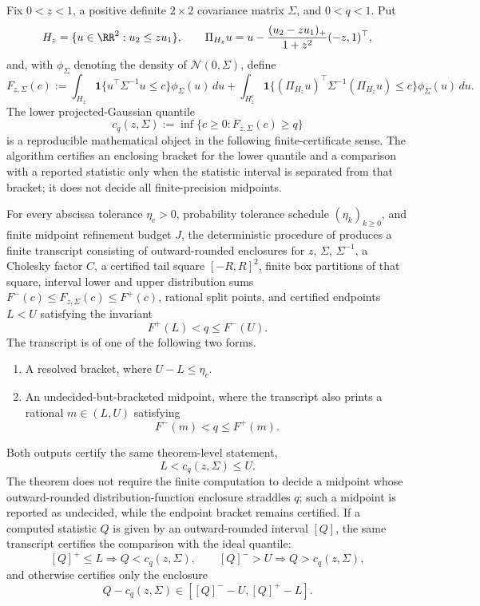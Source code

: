 \begin{algorithmiclemma}\label{alg:certified-projected-gaussian-quantile-algorithm-long-copy}
Fix \(0<z<1\), a positive definite \(2\times2\) covariance matrix
\(\Sigma\), and \(0<q<1\).  Put
\[
H_z=\{u\in\RR^2:u_2\le zu_1\},\qquad
\Pi_{H_z}u=u-\frac{(u_2-zu_1)_+}{1+z^2}(-z,1)^\top ,
\]
and, with \(\phi_\Sigma\) denoting the density of
\(\mathcal N(0,\Sigma)\), define
\begin{equation}\label{eq:certified-projected-gaussian-cdf-main}
F_{z,\Sigma}(c)
:=\int_{H_z}\mathbf1\{u^\top\Sigma^{-1}u\le c\}\phi_\Sigma(u)\,du
+\int_{H_z^c}
\mathbf1\{(\Pi_{H_z}u)^\top\Sigma^{-1}(\Pi_{H_z}u)\le c\}
\phi_\Sigma(u)\,du .
\end{equation}
The lower projected-Gaussian quantile
\[
c_q(z,\Sigma):=\inf\{c\ge0:F_{z,\Sigma}(c)\ge q\}
\]
is a reproducible mathematical object in the following finite-certificate
sense.  The algorithm certifies an enclosing bracket for the lower quantile
and a comparison with a reported statistic only when the statistic interval is
separated from that bracket; it does not decide all finite-precision
midpoints.

For every abscissa tolerance \(\eta_c>0\), probability tolerance schedule
\((\eta_k)_{k\ge0}\), and finite midpoint refinement budget \(J\), the
deterministic procedure of
 produces
a finite transcript consisting of outward-rounded enclosures for \(z\),
\(\Sigma\), \(\Sigma^{-1}\), a Cholesky factor \(C\), a certified tail square
\([-R,R]^2\), finite box partitions of that square, interval lower and upper
distribution sums \(F^-(c)\le F_{z,\Sigma}(c)\le F^+(c)\), rational split
points, and certified endpoints \(L<U\) satisfying the invariant
\[
F^+(L)<q\le F^-(U).
\]
The transcript is of one of the following two forms.
\begin{enumerate}[label=\textup{(\alph*)},leftmargin=2.4em,itemsep=0.2em]
\item A resolved bracket, where \(U-L\le\eta_c\).
\item An undecided-but-bracketed midpoint, where the transcript also prints a
rational \(m\in(L,U)\) satisfying
\[
F^-(m)<q\le F^+(m).
\]
\end{enumerate}
Both outputs certify the same theorem-level statement,
\[
L<c_q(z,\Sigma)\le U .
\]
The theorem does not require the finite computation to decide a midpoint whose
outward-rounded distribution-function enclosure straddles \(q\); such a
midpoint is reported as undecided, while the endpoint bracket remains
certified.
If a computed statistic \(Q\) is given by an outward-rounded interval
\([Q]\), the same transcript certifies the comparison with the ideal quantile:
\[
[Q]^+\le L\Rightarrow Q<c_q(z,\Sigma),\qquad
[Q]^->U\Rightarrow Q>c_q(z,\Sigma),
\]
and otherwise certifies only the enclosure
\[
Q-c_q(z,\Sigma)\in[[Q]^--U,[Q]^+-L].
\]


\end{algorithmiclemma}
